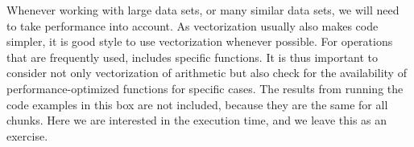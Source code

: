 \documentclass[krantz2]{krantz}\usepackage{knitr}
\begin{document}
\begin{explainbox}
Whenever\label{box:vectorization:perf} working with large data sets, or many similar data sets, we will need to take performance into account. As vectorization usually also makes code simpler, it is good style to use vectorization whenever possible. For operations that are frequently used, \Rlang includes specific functions. It is thus important to consider not only vectorization of arithmetic but also check for the availability of performance-optimized functions for specific cases. The results from running the code examples in this box are not included, because they are the same for all chunks. Here we are interested in the execution time, and we leave this as an exercise.

\begin{knitrout}\footnotesize
{}\color{fgcolor}\begin{kframe}
\begin{alltt}
 \hlkwb{<-} \hlstd{(}\hlopt{^}\hlstd{)} 
\end{alltt}
\end{kframe}
\end{knitrout}

\begin{knitrout}\footnotesize
{}\color{fgcolor}\begin{kframe}
\begin{alltt}
 \hlkwb{<-} \hlstd{(}\hlopt{-}\hlstd{)} 
 \hlkwb{<-} 
  \hlopt{<} 
   \hlkwb{<-} \hlstd{a[i}\hlopt{+}\hlstd{]} \hlopt{-} 
   \hlkwb{<-}  \hlopt{+} 
\hlstd{\}}
\end{alltt}
\end{kframe}
\end{knitrout}

\begin{knitrout}\footnotesize
{}\color{fgcolor}\begin{kframe}
\begin{alltt}
 \hlkwb{<-} \hlstd{(}\hlopt{-}\hlstd{)} 
  \hlstd{(} 
   \hlkwb{<-} \hlstd{a[i}\hlopt{+}\hlstd{]} \hlopt{-} 
\hlstd{\}}
\end{alltt}
\end{kframe}
\end{knitrout}


\end{explainbox}
\end{document}
